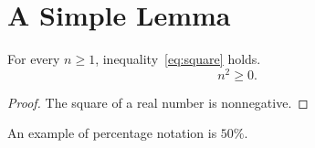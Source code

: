 \section{A Simple Lemma}

\begin{lemma}\label{lem:nonnegative}
    For every $n \geq 1$, inequality~\eqref{eq:square} holds.
    \begin{equation}\label{eq:square}
        n^2 \geq 0.
    \end{equation}
\end{lemma}
\begin{proof}
    The square of a real number is nonnegative.
\end{proof}

An example of percentage notation is $50\%$.
